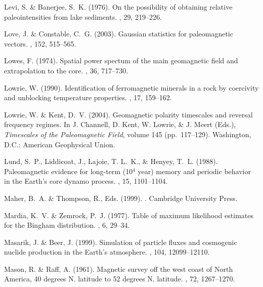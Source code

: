 Levi, S. \& Banerjee, S.~K. (1976).
\newblock On the possibility of obtaining relative paleointensities from lake
  sediments.
, 29, 219--226.

Love, J. \& Constable, C.~G. (2003).
\newblock Gaussian statistics for paleomagnetic vectors.
, 152, 515--565.

Lowes, F. (1974).
\newblock Spatial power spectum of the main geomagnetic field and extrapolation
  to the core.
, 36, 717--730.

Lowrie, W. (1990).
\newblock Identification of ferromagnetic minerals in a rock by coercivity and
  unblocking temperature properties.
, 17, 159--162.

Lowrie, W. \& Kent, D.~V. (2004).
\newblock Geomagnetic polarity timescales and reversal frequency regimes.
\newblock In J. Channell, D. Kent, W. Lowrie, \& J. Meert (Eds.), {\em
  Timescales of the Paleomagnetic Field}, volume 145  (pp.\ 117--129).
  Washington, D.C.: American Geophysical Union.

Lund, S.~P., Liddicoat, J., Lajoie, T. L.~K., \& Henyey, T.~L. (1988).
\newblock Paleomagnetic evidence for long-term (10$^4$ year) memory and
  periodic behavior in the Earth's core dynamo process.
, 15, 1101--1104.

Maher, B.~A. \& Thompson, R., Eds. (1999).
.
\newblock Cambridge University Press.

Mardia, K.~V. \& Zemrock, P.~J. (1977).
\newblock Table of maximum likelihood estimates for the Bingham distribution.
, 6, 29--34.

Masarik, J. \& Beer, J. (1999).
\newblock Simulation of particle fluxes and cosmogenic nuclide production in
  the Earth's atmosphere.
, 104, 12099--12110.

Mason, R. \& Raff, A. (1961).
\newblock Magnetic survey off the west coast of North America, 40 degrees N.
  latitude to 52 degrees N. latitude.
, 72, 1267--1270.

